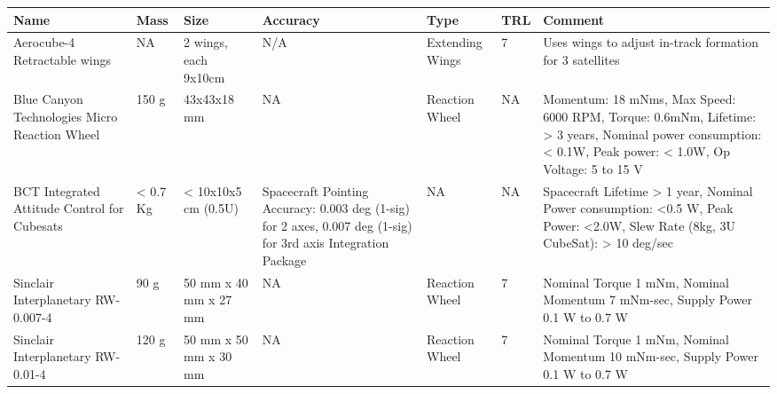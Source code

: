 \begin{center}
     \begin{tabular}{ | p{2cm} | p{1.25cm} | p{2cm} | p{2cm} | p{2cm} | p{1cm} | p{5cm} |}
     \hline
      {\bf Name} & {\bf Mass} & {\bf Size} & {\bf Accuracy} & {\bf Type} & {\bf TRL} & {\bf Comment}  \\ \hline
      
	  Aerocube-4 Retractable wings \cite{Gangestad} & NA & 2 wings, each 9x10cm & N/A & Extending Wings & 7 & Uses wings to adjust in-track formation for 3 satellites \\ \hline
	  
	  Blue Canyon Technologies Micro Reaction Wheel \cite{BCT} & 150 g & 43x43x18 mm & NA & Reaction Wheel & NA & Momentum: 18 mNms, Max Speed: 6000 RPM, Torque: 0.6mNm, Lifetime: > 3 years, Nominal power consumption: < 0.1W, Peak power: < 1.0W, Op Voltage: 5 to 15 V \\ \hline
	  
	  BCT Integrated Attitude Control for Cubesats \cite{BCT} & < 0.7 Kg & < 10x10x5 cm (0.5U) & Spacecraft Pointing Accuracy: 0.003 deg (1-sig) for 2 axes, 0.007 deg (1-sig) for 3rd axis	Integration Package & NA & NA & Spacecraft Lifetime > 1 year, Nominal Power consumption: <0.5 W, Peak Power: <2.0W, Slew Rate (8kg, 3U CubeSat): > 10 deg/sec   \\ \hline
	 
	 Sinclair Interplanetary RW-0.007-4 \cite{Sinclair} & 90 g & 50 mm x 40 mm x 27 mm & NA & Reaction Wheel & 7 & Nominal Torque 1 mNm, Nominal Momentum 7 mNm-sec, Supply Power 0.1 W to 0.7 W \\ \hline

	Sinclair Interplanetary RW-0.01-4 \cite{Sinclair} & 120 g & 50 mm x 50 mm x 30 mm & NA & Reaction Wheel & 7 & Nominal Torque 1 mNm, Nominal Momentum 10 mNm-sec, Supply Power 0.1 W to 0.7 W \\ \hline
		  
	 \end{tabular}
\end{center} 


